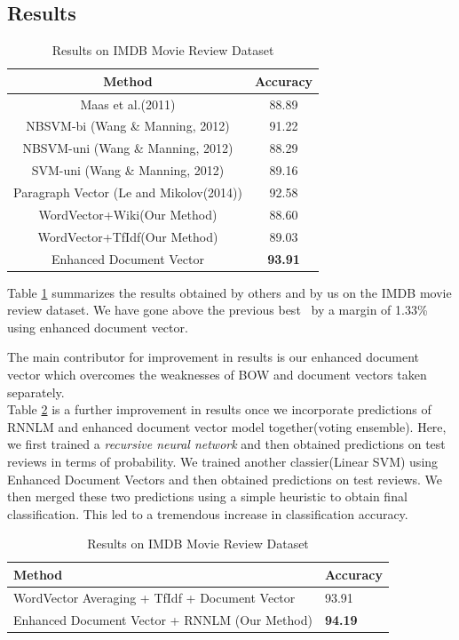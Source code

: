 \documentclass[11pt,a4paper]{article}
\begin{document}
\subsection{Results}
\begin {table}[H]
\centering
\small
\begin{tabular}{ | c | c | }
\hline
\textbf{Method} & \textbf{Accuracy} \\ \hline
Maas et al.(2011) & 88.89\\ \hline
NBSVM-bi (Wang \& Manning, 2012) & 91.22\\ \hline
NBSVM-uni (Wang \& Manning, 2012) & 88.29\\ \hline
SVM-uni (Wang \& Manning, 2012) & 89.16\\ \hline
Paragraph Vector (Le and Mikolov(2014)) & 92.58\\ \hline
WordVector+Wiki(Our Method) & 88.60\\ \hline
WordVector+TfIdf(Our Method) & 89.03\\ \hline
Enhanced Document Vector & \textbf{93.91}\\ \hline

\end{tabular}
\caption {Results on IMDB Movie Review Dataset}
\label{table:IMDB}
\end{table}

Table \ref{table:IMDB} summarizes the results obtained by others and by us on the IMDB movie review dataset. We have gone above the previous best~\cite{Le:14} by a margin of 1.33\% using enhanced document vector.

The main contributor for improvement in results is our enhanced document vector which overcomes the weaknesses of BOW and document vectors taken separately.\\
Table \ref{table:IMDB_rnnlm} is a further improvement in results once we incorporate predictions of RNNLM and enhanced document vector model together(voting ensemble). Here, we first trained a \emph{recursive neural network} and then obtained predictions on test reviews in terms of probability. We trained another classier(Linear SVM) using Enhanced Document Vectors and then obtained predictions on test reviews. We then merged these two predictions using a simple heuristic to obtain final classification. This led to a tremendous increase in classification accuracy.


\begin {table}[H]
\centering
\small
\begin{tabular}{ | p{5.5cm} | p{1.2cm} | }
\hline
\textbf{Method} & \textbf{Accuracy} \\ \hline
WordVector Averaging + TfIdf + Document Vector & 93.91\\ \hline
Enhanced Document Vector + RNNLM (Our Method) & \textbf{94.19}\\ \hline
\end{tabular}
\caption {Results on IMDB Movie Review Dataset}
\label{table:IMDB_rnnlm}
\end{table}
\end{document}

